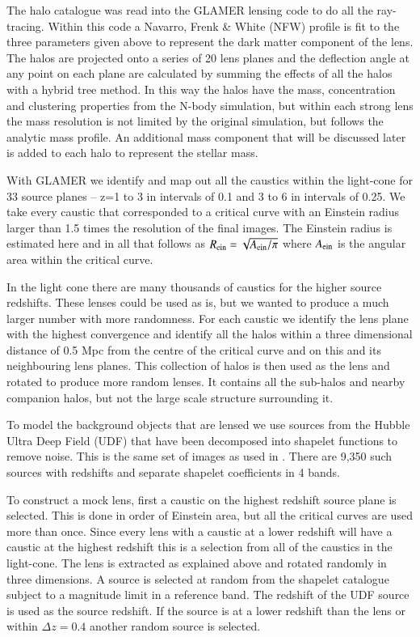 \documentclass{aa}
\begin{document}
The halo catalogue was read into the GLAMER lensing code \citep{2014MNRAS.445.1942M,2014MNRAS.445.1954P} to do all the ray-tracing.    Within this code a Navarro, Frenk \& White (NFW) \citep{1996ApJ...462..563N} profile is fit to the three parameters given above to represent the dark matter component of the lens.  The halos are projected onto a series of 20 lens planes  and the deflection angle at any point on each plane are calculated by summing the effects of all the halos with a hybrid tree method.  In this way the halos have the mass, concentration and clustering properties from the N-body simulation, but within each strong lens the mass resolution is not limited by the original simulation, but follows the analytic mass profile.   An additional mass component that will be discussed later is added to each halo to represent the stellar mass.

With GLAMER we identify and map out all the caustics within the light-cone for 33 source planes -- z=1 to 3 in intervals of 0.1 and 3 to 6 in intervals of 0.25.  We take every caustic that corresponded to a critical curve with an Einstein radius larger than 1.5 times the resolution of the final images.  The Einstein radius is estimated here and in all that follows as $R_{\rm ein}=\sqrt{A_{\rm ein}/\pi}$ where $A_{\rm ein}$ is the angular area within the critical curve.

 In the light cone there are many thousands of caustics for the higher source redshifts.  These lenses could be used as is, but we wanted to produce a much larger number with more randomness.   For each caustic we identify the lens plane with the highest convergence and identify all the halos within a three dimensional distance of 0.5 Mpc from the centre of the critical curve and on this and its neighbouring lens planes.    This collection of halos is then used as the lens and rotated to produce more random lenses.    It  contains all the sub-halos and nearby companion halos, but not the large scale structure surrounding it.

To model the background objects that are lensed we use sources from
the Hubble Ultra Deep Field (UDF) that have been decomposed into
shapelet functions to remove noise.  This is the same set of images as
used in \citet{2008AandA...482..403M,2010AandA...514A..93M} \citep[see
also][]{2019MNRAS.482.2823P}.   There are 9,350 such sources with redshifts and separate shapelet coefficients in 4 bands.   

To construct a mock lens, first a caustic on the highest redshift source plane is selected.  This is done in order of Einstein area, but all the critical curves are used more than once.  Since every lens with a caustic at a lower redshift will have a caustic at the highest redshift this is a selection from all of the caustics in the light-cone.   The lens is extracted as explained above and rotated randomly in three dimensions.  A source is selected at random from the shapelet catalogue subject to a magnitude limit in a reference band.   The redshift of the UDF source is used as the source redshift.  If the source is at a lower redshift than the lens or within $\Delta z = 0.4$ another random source is selected.
\end{document}
